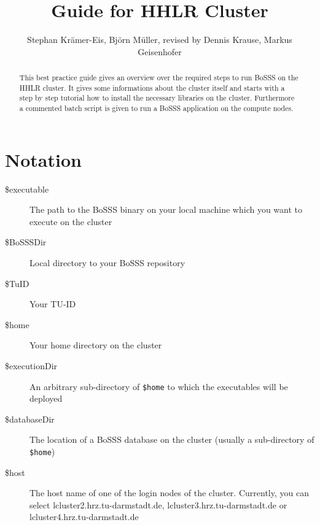 \documentclass[11pt,twoside,a4paper]{fdyartcl}
\title{Guide for HHLR Cluster}
\author{Stephan Krämer-Eis, Björn Müller, revised by Dennis Krause, Markus Geisenhofer}
\begin{document}

\setcounter{page}{1} %

\maketitle


\begin{abstract}
This best practice guide gives an overview over the required steps to run BoSSS on the HHLR cluster. It gives some informations about the cluster itself and starts with a step by step tutorial how to install the necessary libraries on the cluster. Furthermore a commented batch script is given to run a BoSSS application on the compute nodes.
\end{abstract}




%
\section{Notation}
\label{sec:notation}
\begin{description}
	\item[\$executable] The path to the BoSSS binary on your local machine which you want to  execute on the cluster
	\item[\$BoSSSDir] Local directory to your BoSSS repository
	\item[\$TuID] Your TU-ID
	\item[\$home] Your home directory on the cluster
	\item[\$executionDir] An arbitrary sub-directory of \verb|$home| to which the executables will be deployed
	\item[\$databaseDir] The location of a BoSSS database on the cluster (usually a sub-directory of \verb|$home|)
	\item[\$host] The host name of one of the login nodes of the cluster. Currently, you can select lcluster2.hrz.tu-darmstadt.de, lcluster3.hrz.tu-darmstadt.de or lcluster4.hrz.tu-darmstadt.de
\end{description}
\end{document}
